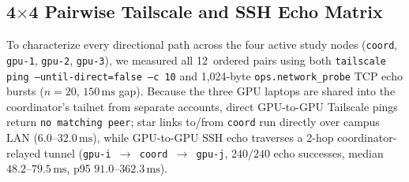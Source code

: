 \documentclass[11pt,a4paper]{article}
\begin{document}
\subsection{4$\times$4 Pairwise Tailscale and SSH Echo Matrix}
To characterize every directional path across the four active study nodes (\texttt{coord}, \texttt{gpu-1}, \texttt{gpu-2}, \texttt{gpu-3}), we measured all 12~ordered pairs using both \texttt{tailscale ping --until-direct=false --c 10} and 1,024-byte \texttt{ops.network\_probe} TCP echo bursts ($n=20$, $150\,\text{ms}$ gap). Because the three GPU laptops are shared into the coordinator's tailnet from separate accounts, direct GPU-to-GPU Tailscale pings return \texttt{no matching peer}; star links to/from \texttt{coord} run directly over campus LAN ($6.0$--$32.0\,\text{ms}$), while GPU-to-GPU SSH echo traverses a 2-hop coordinator-relayed tunnel (\texttt{gpu-i $\to$ coord $\to$ gpu-j}, $240/240$ echo successes, median $48.2$--$79.5\,\text{ms}$, p95 $91.0$--$362.3\,\text{ms}$).
\end{document}
